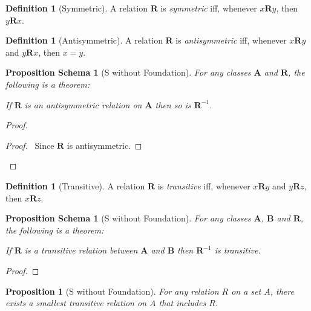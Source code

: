\documentclass{book}
\let\qed\relax
\newtheorem{prop}[ax]{Proposition}
\newtheorem{props}[ax]{Proposition Schema}
\theoremstyle{definition}
\newtheorem{df}[ax]{Definition}
\begin{document}
\begin{df}[Symmetric]
A relation $\mathbf{R}$ is \emph{symmetric} iff, whenever $x\mathbf{R}y$, then $y\mathbf{R}x$.
\end{df}

\begin{df}[Antisymmetric]
A relation $\mathbf{R}$ is \emph{antisymmetric} iff, whenever $x \mathbf{R} y$ and $y \mathbf{R} x$, then $x = y$.
\end{df}

\begin{props}[S without Foundation]
\label{prop:invantisym}
For any classes $\mathbf{A}$ and $\mathbf{R}$, the following is a theorem:

If $\mathbf{R}$ is an antisymmetric relation on $\mathbf{A}$ then so is $\mathbf{R}^{-1}$.
\end{props}

\begin{proof}
\pf
{}
\begin{proof}
	\pf\ Since $\mathbf{R}$ is antisymmetric.
\end{proof}
\qed
\end{proof}

\begin{df}[Transitive]
A relation $\mathbf{R}$ is \emph{transitive} iff, whenever $x\mathbf{R}y$ and $y \mathbf{R} z$, then $x\mathbf{R} z$.
\end{df}

\begin{props}[S without Foundation]
\label{prop:invtrans}
For any classes $\mathbf{A}$, $\mathbf{B}$ and $\mathbf{R}$, the following is a theorem:

If $\mathbf{R}$ is a transitive relation between $\mathbf{A}$ and $\mathbf{B}$ then $\mathbf{R}^{-1}$ is transitive.
\end{props}

\begin{proof}
\pf
{}
\qed
\end{proof}

\begin{prop}[S without Foundation]
For any relation $R$ on a set $A$, there exists a smallest transitive relation on $A$ that includes $R$.
\end{prop}
\end{document}
